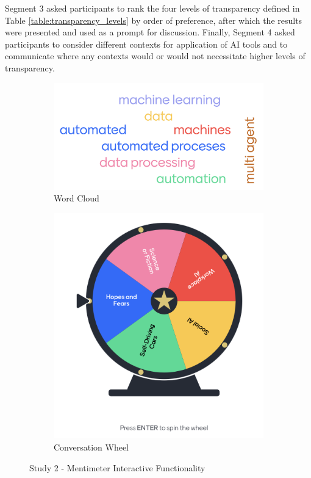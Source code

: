\documentclass[manuscript,screen,review]{acmart}
\begin{document}
Segment 3 asked participants to rank the four levels of transparency defined in Table \ref{table:transparency_levels} by order of preference, after which the results were presented and used as a prompt for discussion. Finally, Segment 4 asked participants to consider different contexts for application of AI tools and to communicate where any contexts would or would not necessitate higher levels of transparency.

\begin{figure}[h]
       \centering
     \begin{subfigure}[c]{0.48\textwidth}
         \centering
         \includegraphics[width=\textwidth]{graphics/word_cloud.png}
         \caption{Word Cloud}
         \label{fig:word_cloud}
     \end{subfigure}
     \hfill
     \begin{subfigure}[c]{0.48\textwidth}
         \centering
         \includegraphics[width=\textwidth]{graphics/conversation_wheel.png}
         \caption{Conversation Wheel}
         \label{fig:conversation_wheel}
     \end{subfigure}
     \caption{Study 2 - Mentimeter Interactive Functionality}
     \hfill
\end{figure}
\end{document}
